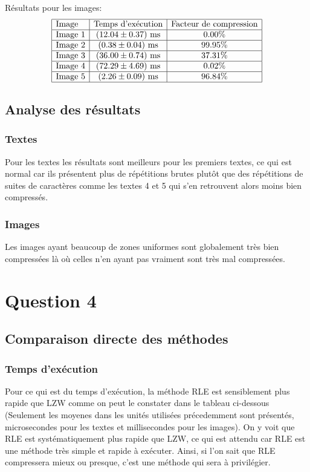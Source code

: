 \documentclass{article}[letterpaper, 11pt]
\begin{document}
Résultats pour les images:
\[
\begin{array}{|l|c|c|} \hline %
	\text{Image} & \text{Temps d'exécution} & \text{Facteur de compression}\\ \hline %
	\text{Image } 1 & (12.04 \pm 0.37) \text{ ms} & 0.00\%\\ \hline %
	\text{Image } 2 & ( 0.38 \pm 0.04) \text{ ms} & 99.95\%\\ \hline %
	\text{Image } 3 & (36.00 \pm 0.74) \text{ ms} & 37.31\%\\ \hline %
	\text{Image } 4 & (72.29 \pm 4.69) \text{ ms} & 0.02\%\\ \hline %
	\text{Image } 5 & ( 2.26 \pm 0.09) \text{ ms} & 96.84\%\\ \hline %

\end{array}
\]

\subsection{Analyse des résultats}
\subsubsection{Textes}
Pour les textes les résultats sont meilleurs pour les premiers textes, ce qui est normal car ils présentent plus de répétitions brutes plutôt que des répétitions de suites de caractères comme les textes 4 et 5 qui s'en retrouvent alors moins bien compressés.
\subsubsection{Images}
Les images ayant beaucoup de zones uniformes sont globalement très bien compressées là où celles n'en ayant pas vraiment sont très mal compressées.
\section{Question 4}
\subsection{Comparaison directe des méthodes}
\subsubsection{Temps d'exécution}
Pour ce qui est du temps d'exécution, la méthode RLE est sensiblement plus rapide que LZW comme on peut le constater dans le tableau ci-dessous (Seulement les moyenes dans les unités utilisées précedemment sont présentés, microsecondes pour les textes et millisecondes pour les images). On y voit que RLE est systématiquement plus rapide que LZW, ce qui est attendu car RLE est une méthode très simple et rapide à exécuter. Ainsi, si l'on sait que RLE compressera mieux ou presque, c'est une méthode qui sera à privilégier.
\end{document}
